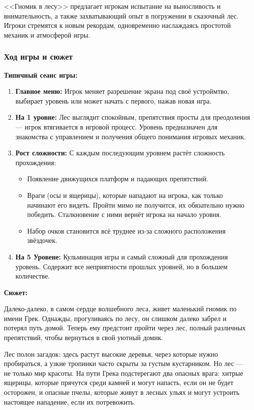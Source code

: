 \documentclass{article}
\begin{document}
\noindent <<Гномик в лесу>> предлагает игрокам испытание на выносливость и внимательность, а также захватывающий опыт в погружении в сказочный лес. Игроки стремятся к новым рекордам, одновременно наслаждаясь простотой механик и атмосферой игры.


\subsubsection{Ход игры и сюжет}

\textbf{Типичный сеанс игры:}
\begin{enumerate}
    \item \textbf{Главное меню:} Игрок меняет разрешение экрана под своё устроймтво, выбирает уровень или может начать с первого, нажав новая игра.
    \item \textbf{На 1 уровне:} Лес выглядит спокойным, препятствия просты для преодоления — игрок втягивается в игровой процесс. Уровень предназначен для знакомства с управлением и получения общего понимания игровых механик.
    \item \textbf{Рост сложности:} С каждым последующим уровнем растёт сложность прохождения:
    \begin{itemize}
        \item Появление движущихся платформ и падающих препятствий.
        \item Враги (осы и ящерицы), которые нападают на игрока, как только начинают его видеть. Пройти мимо не получится, их обязательно нужно победить. Сталкновение с ними вернёт игрока на начало уровня.
        \item Набор очков становится всё труднее из-за сложного расположения звёздочек.
    \end{itemize}
    \item \textbf{На 5 Уровене:} Кульминация игры и самый сложный для прохождения уровень. Содержит все неприятности прошлых уровней, но в большем количестве.
\end{enumerate}

\noindent\textbf{Сюжет:} 

Далеко-далеко, в самом сердце волшебного леса, живет маленький гномик по имени Грек. Однажды, прогуливаясь по лесу, он слишком далеко забрел и потерял путь домой. Теперь ему предстоит пройти через лес, полный различных препятствий, чтобы вернуться в свой уютный домик.

Лес полон загадок: здесь растут высокие деревья, через которые нужно пробираться, а узкие тропинки часто скрыты за густым кустарником. Но лес — не только мир красоты. На пути Грека подстерегают два опасных врага: хитрые ящерицы, которые прячутся среди камней и могут напасть, если он не будет осторожен, и опасные пчелы, которые живут в лесных ульях и могут устроить настоящее нападение, если их потревожить.
\end{document}
